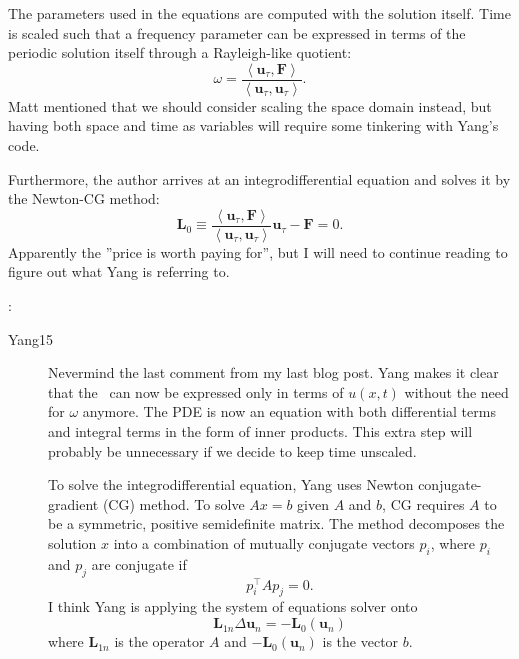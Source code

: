 \begin{description}
{\begin{description}
The parameters used in the equations are computed with the solution itself. Time is
scaled such that a frequency parameter can be expressed in terms of the periodic solution
itself through a Rayleigh-like quotient:
\begin{equation}
    \omega = \frac{\left< \mathbf{u}_{\tau}, \mathbf{F} \right>}{\left< \mathbf{u}_{\tau}, \mathbf{u}_{\tau} \right>}.
\end{equation}
Matt mentioned that we should consider scaling the space domain instead, but having both
space and time as variables will require some tinkering with Yang's code.

Furthermore, the author arrives at an integrodifferential equation and solves it by the
Newton-CG method:
\begin{equation}
    \mathbf{L}_0 \equiv \frac{\left< \mathbf{u}_{\tau}, \mathbf{F} \right>}{\left< \mathbf{u}_{\tau}, \mathbf{u}_{\tau} \right>} \mathbf{u}_{\tau} - \mathbf{F} = 0.
\end{equation}
Apparently the ''price is worth paying for'', but I will need to continue reading to figure
out what Yang is referring to.

\end{description}
}

{ :
\begin{description}
\item[Yang15]
Nevermind the last comment from my last blog post. Yang makes it clear that the \KSe\
can now be expressed only in terms of $u(x,t)$ without the need for $\omega$ anymore.
The PDE is now an equation with both differential terms and integral terms in the form
of inner products. This extra step will probably be unnecessary if we decide to keep
time unscaled.

To solve the integrodifferential equation, Yang uses Newton conjugate-gradient (CG)
method. To solve $Ax = b$ given $A$ and $b$, CG requires $A$ to be a symmetric,
positive semidefinite matrix. The method decomposes the solution $x$ into a combination
of mutually conjugate vectors $p_i$, where $p_i$ and $p_j$ are conjugate if
\begin{equation}
    p_i^{\top} A p_j = 0.
\end{equation}
I think Yang is applying the system of equations solver onto
\begin{equation}
    \mathbf{L}_{1n} \Delta \mathbf{u}_n = -\mathbf{L}_0(\mathbf{u}_n)
\end{equation}
where $\mathbf{L}_{1n}$ is the operator $A$ and $-\mathbf{L}_0(\mathbf{u}_n)$ is the
vector $b$.


\end{description}}
\end{description}
